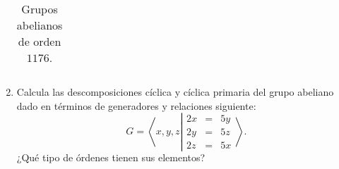 \begin{ejercicio}
\begin{enumerate}
\begin{table}[h]
\begin{tabular}{c|c|c|c|c}
            \end{tabular}
            \caption{Grupos abelianos de orden $1176$.}
            \label{tab:grupos_abelianos_orden_1176}
        \end{table}
        \item Calcula las descomposiciones cíclica y cíclica primaria del grupo abeliano dado en términos de generadores y relaciones siguiente:
        \begin{equation*}
            G = \left\langle x, y, z \left|
                \begin{array}{rcl}
                    2x &=& 5y \\
                    2y &=& 5z \\
                    2z &=& 5x
                \end{array}
            \right.\right\rangle.
        \end{equation*}
        ¿Qué tipo de órdenes tienen sus elementos?


\end{enumerate}
\end{ejercicio}
